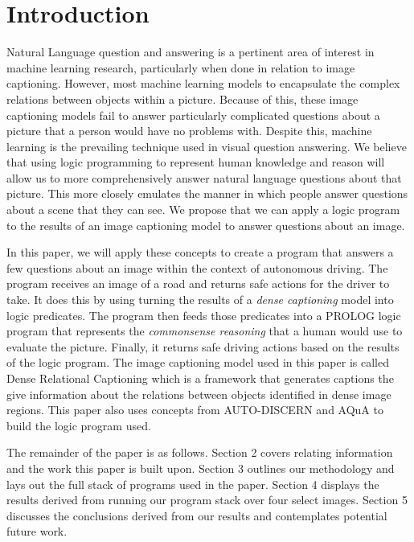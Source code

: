 \section{Introduction}
Natural Language question and answering is a pertinent area of interest in machine learning research, particularly when done in relation to image captioning. However, most machine learning models to encapsulate the complex relations between objects within a picture. Because of this, these image captioning models fail to answer particularly complicated questions about a picture that a person would have no problems with. Despite this, machine learning is the prevailing technique used in visual question answering. We believe that using logic programming to represent human knowledge and reason will allow us to more comprehensively answer natural language questions about that picture. This more closely emulates the manner in which people answer questions about a scene that they can see. We propose that we can apply a logic program to the results of an image captioning model to answer questions about an image.

In this paper, we will apply these concepts to create a program that answers a few questions about an image within the context of autonomous driving. The program receives an image of a road and returns safe actions for the driver to take. It does this by using turning the results of a \emph{dense captioning} model into logic predicates. The program then feeds those predicates into a PROLOG logic program that represents the \emph{commonsense reasoning} that a human would use to evaluate the picture. Finally, it returns safe driving actions based on the results of the logic program. The image captioning model used in this paper is called Dense Relational Captioning\cite{kim2019dense} which is a framework that generates captions the give information about the relations between objects identified in dense image regions. This paper also uses concepts from AUTO-DISCERN\cite{kothawade2021autodiscern} and AQuA\cite{inproceedings} to build the logic program used.

The remainder of the paper is as follows. Section 2 covers relating information and the work this paper is built upon. Section 3 outlines our methodology and lays out the full stack of programs used in the paper. Section 4 displays the results derived from running our program stack over four select images. Section 5 discusses the conclusions derived from our results and contemplates potential future work.